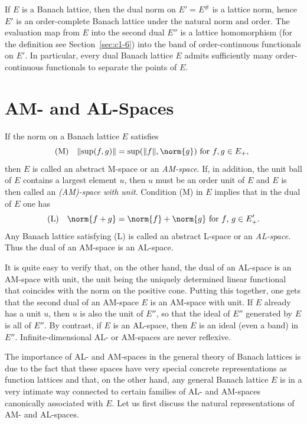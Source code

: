 If\/ $ E $ is a Banach lattice, then the dual norm on $ E' = E^{\#} $ is a lattice norm, hence $ E' $ is an order-complete Banach lattice under the natural norm and order.
The evaluation map from $ E $ into the second dual $ E'' $ is a lattice homomorphism (for the definition see Section~\ref{sec:c1-6}) into the band of order-continuous functionals on $ E' $.
In particular, every dual Banach lattice $ E $ admits sufficiently many order-continuous functionals to separate the points of\/ $ E $.
\section{AM- and AL-Spaces}\label{sec:c1-4}%
%
If the norm on a Banach lattice $ E $ satisfies
\begin{equation*}\label{eq:c1-2}
	\mathrm{(M)} \quad \lVert \sup(f,g) \rVert = \sup(\lVert f \rVert,\norm{g}) \text{ for $ f, g \in E_{+}$, }  
\end{equation*}
then $ E $ is called an abstract M-space or an \emph{AM-space}.
If, in addition, the unit ball of\/ $ E $ contains a largest element $ u $, then $ u $ must be an order unit of\/ $ E $ and $ E $ is then called an \emph{(AM)-space with unit}.
Condition (M) in $ E $ implies that in the dual of\/ $ E $ one has
\begin{equation*}\label{eq:c1-3}
	\mathrm{(L)} \quad \norm{f + g} = \norm{f} + \norm{g} \text{ for $ f $, $ g \in E_{+}'$.} 
\end{equation*}
Any Banach lattice satisfying (L) is called an abstract L-space or an \emph{AL-space}.
Thus the dual of an AM-space is an AL-space.

It is quite easy to verify that, on the other hand, the dual of an AL-space is an AM-space with unit, the unit being the uniquely determined linear functional that coincides with the norm on the positive cone.
Putting this together, one gets that the second dual of an AM-space $ E $ is an AM-space with unit.
If\/ $ E $ already has a unit $ u $, then $ u $ is also the unit of\/ $ E'' $, so that the ideal of\/ $ E'' $ generated by $ E $ is all of\/ $ E'' $.
By contrast, if\/ $ E $ is an AL-space, then $ E $ is an ideal (even a band) in $ E'' $.
Infinite-dimensional AL- or AM-spaces are never reflexive.

The importance of AL- and AM-spaces in the general theory of Banach lattices is due to the fact that these spaces have very special concrete representations as function lattices and that, on the other hand, any general Banach lattice $ E $ is in a very intimate way connected to certain families of AL- and AM-spaces canonically associated with $ E $.
Let us first discuss the natural representations of AM- and AL-spaces.

